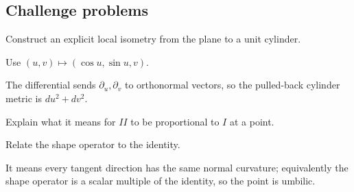 \subsection*{Challenge problems}

\begin{exercise}\label{exr:vii15-ped-15}
Construct an explicit local isometry from the plane to a unit cylinder.
\end{exercise}
\begin{hint}
Use \((u,v)\mapsto(\cos u,\sin u,v)\).
\end{hint}
\begin{solution}
The differential sends \(\partial_u,\partial_v\) to orthonormal vectors, so the pulled-back cylinder metric is \(du^2+dv^2\).
\end{solution}

\begin{exercise}\label{exr:vii15-ped-16}
Explain what it means for \(II\) to be proportional to \(I\) at a point.
\end{exercise}
\begin{hint}
Relate the shape operator to the identity.
\end{hint}
\begin{solution}
It means every tangent direction has the same normal curvature; equivalently the shape operator is a scalar multiple of the identity, so the point is umbilic.
\end{solution}

